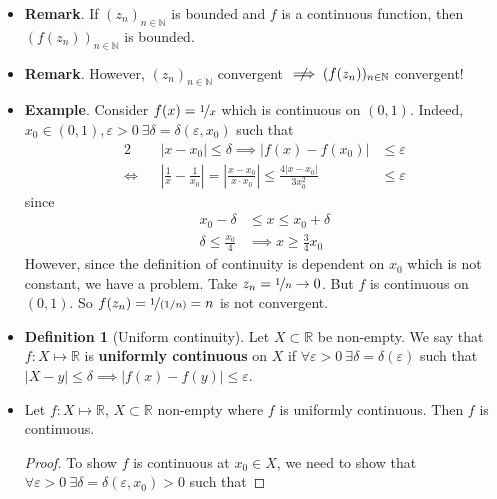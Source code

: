\documentclass{article}
\newcommand{\R}{\mathbb{R}}
\newcommand{\N}{\mathbb{N}}
\newcommand{\seq}[2]{(#1_{#2})_{#2 \in \N}}
\newcommand{\?}{\stackrel{?}{=}}
\theoremstyle{definition} %
\newtheorem{definition}[subsection]{Definition} %
\begin{document}
\begin{itemize}
    \item \textbf{Remark}. If $\seq{z}{n}$ is bounded and $f$ is a continuous function, then $(f(z_n))_{n \in \N}$ is bounded.
    \item \textbf{Remark}. However, $\seq{z}{n}$ convergent $\centernot\implies (f(z_n))_{n \in \N}$ convergent!
    \item \textbf{Example}. Consider $f(x) = \nicefrac{1}{x}$ which is continuous on $(0, 1)$. Indeed, $x_0 \in (0, 1), \varepsilon > 0 \ \exists \delta = \delta(\varepsilon, x_0)$ such that
          \begin{alignat*}{2}
                   &  & |x - x_0| \leq \delta \implies |f(x) - f(x_0)|                                                                     & \leq \varepsilon               \\
              \iff &  & \left|\frac{1}{x} - \frac{1}{x_0}\right| = \left|\frac{x - x_0}{x \cdot x_0}\right| \leq \frac{4|x - x_0|}{3x_0^2} & \leq \varepsilon \tag{ by (*)}
          \end{alignat*}
          since
          \begin{align*}
              x_0 - \delta              & \leq x \leq x_0 + \delta               \\
              \delta \leq \frac{x_0}{4} & \implies x \geq \frac{3}{4}x_0 \tag{*}
          \end{align*}
          However, since the definition of continuity is dependent on $x_0$ which is not constant, we have a problem. Take $z_n = \nicefrac{1}{n} \rightarrow 0$. But $f$ is continuous on $(0, 1)$. So $f(z_n) = \nicefrac{1}{(1/n)} = n$ is not convergent.
    \item[]
          \begin{definition}[Uniform continuity]
              Let $X \subset \R$ be non-empty. We say that $f: X \mapsto \R$ is \textbf{uniformly continuous} on $X$ if $\forall \varepsilon > 0 \ \exists \delta = \delta(\varepsilon)$ such that $|X - y| \leq \delta \implies |f(x) - f(y)| \leq \varepsilon$.
          \end{definition}
    \item[]
          \begin{lemma}
              Let $f: X \mapsto \R$, $X \subset \R$ non-empty where $f$ is uniformly continuous. Then $f$ is continuous.
          \end{lemma}
          \begin{proof}
              To show $f$ is continuous at $x_0 \in X$, we need to show that $\forall \varepsilon > 0 \ \exists \delta = \delta(\varepsilon, x_0) > 0$ such that

\end{proof}
\end{itemize}
\end{document}
